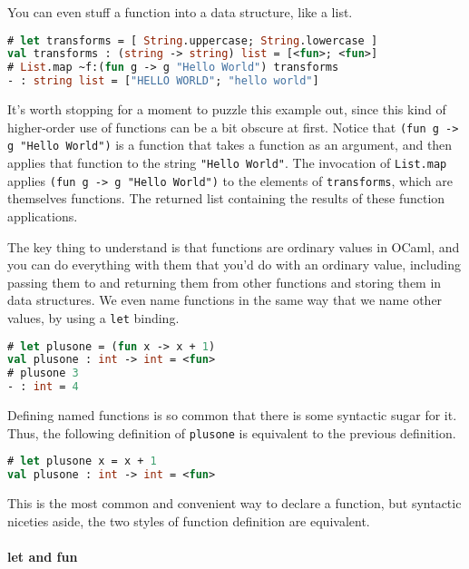 You can even stuff a function into a data structure, like a list.

\begin{lstlisting}[language=Caml]
# let transforms = [ String.uppercase; String.lowercase ]
val transforms : (string -> string) list = [<fun>; <fun>]
# List.map ~f:(fun g -> g "Hello World") transforms
- : string list = ["HELLO WORLD"; "hello world"]
\end{lstlisting}

It's worth stopping for a moment to puzzle this example out, since this
kind of higher-order use of functions can be a bit obscure at first.
Notice that \passthrough{\lstinline!(fun g -> g "Hello World")!} is a
function that takes a function as an argument, and then applies that
function to the string \passthrough{\lstinline!"Hello World"!}. The
invocation of \passthrough{\lstinline!List.map!} applies
\passthrough{\lstinline!(fun g -> g "Hello World")!} to the elements of
\passthrough{\lstinline!transforms!}, which are themselves functions.
The returned list containing the results of these function applications.

The key thing to understand is that functions are ordinary values in
OCaml, and you can do everything with them that you'd do with an
ordinary value, including passing them to and returning them from other
functions and storing them in data structures. We even name functions in
the same way that we name other values, by using a
\passthrough{\lstinline!let!} binding.

\begin{lstlisting}[language=Caml]
# let plusone = (fun x -> x + 1)
val plusone : int -> int = <fun>
# plusone 3
- : int = 4
\end{lstlisting}

Defining named functions is so common that there is some syntactic sugar
for it. Thus, the following definition of
\passthrough{\lstinline!plusone!} is equivalent to the previous
definition.

\begin{lstlisting}[language=Caml]
# let plusone x = x + 1
val plusone : int -> int = <fun>
\end{lstlisting}

This is the most common and convenient way to declare a function, but
syntactic niceties aside, the two styles of function definition are
equivalent.

\hypertarget{let-and-fun}{%
\paragraph{let and fun}\label{let-and-fun}}

